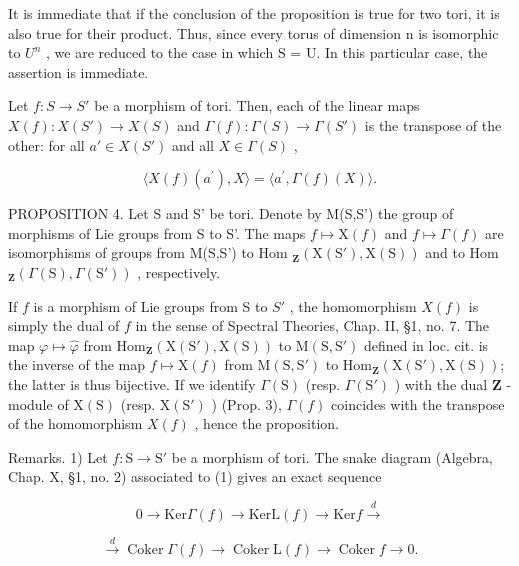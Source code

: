 It is immediate that if the conclusion of the proposition is true for two tori, it is also true for their product. Thus, since every torus of dimension n is isomorphic to \(U^{n}\) , we are reduced to the case in which S = U. In this particular case, the assertion is immediate.

Let \(f: S \to S'\) be a morphism of tori. Then, each of the linear maps \(X(f): X(S') \to X(S)\) and \(\Gamma(f): \Gamma(S) \to \Gamma(S')\) is the transpose of the other: for all \(a' \in X(S')\) and all \(X \in \Gamma(S)\) ,

\[
\langle X (f) (a ^ {\prime}), X \rangle = \langle a ^ {\prime}, \Gamma (f) (X) \rangle .\tag{3}
\]

PROPOSITION 4. Let S and S' be tori. Denote by M(S,S') the group of morphisms of Lie groups from S to S'. The maps \(f \mapsto \mathrm{X}(f)\) and \(f \mapsto \Gamma(f)\) are isomorphisms of groups from M(S,S') to Hom \(_{\mathbf{Z}}(\mathrm{X}(\mathrm{S}'),\mathrm{X}(\mathrm{S}))\) and to Hom \(_{\mathbf{Z}}(\Gamma(\mathrm{S}),\Gamma(\mathrm{S}'))\) , respectively.

If \(f\) is a morphism of Lie groups from S to \(S'\) , the homomorphism \(X(f)\) is simply the dual of \(f\) in the sense of Spectral Theories, Chap. II, §1, no. 7. The map \(\varphi \mapsto \hat{\varphi}\) from \(\mathrm{Hom}_{\mathbf{Z}}(\mathrm{X}(\mathrm{S}'), \mathrm{X}(\mathrm{S}))\) to \(\mathrm{M}(\mathrm{S},\mathrm{S}')\) defined in loc. cit. is the inverse of the map \(f \mapsto \mathrm{X}(f)\) from \(\mathrm{M}(\mathrm{S},\mathrm{S}')\) to \(\mathrm{Hom}_{\mathbf{Z}}(\mathrm{X}(\mathrm{S}'), \mathrm{X}(\mathrm{S}))\); the latter is thus bijective. If we identify \(\Gamma(\mathrm{S})\) (resp. \(\Gamma(\mathrm{S}')\) ) with the dual \(\mathbf{Z}\) -module of \(\mathrm{X}(\mathrm{S})\) (resp. \(\mathrm{X}(\mathrm{S}')\) ) (Prop. 3), \(\Gamma(f)\) coincides with the transpose of the homomorphism \(X(f)\) , hence the proposition.

Remarks. 1) Let \(f: \mathrm{S} \to \mathrm{S}'\) be a morphism of tori. The snake diagram (Algebra, Chap. X, §1, no. 2) associated to (1) gives an exact sequence

\[
0 \longrightarrow \mathrm{Ker} \Gamma (f) \longrightarrow \mathrm{KerL} (f) \longrightarrow \mathrm{Ker} f \stackrel {d} {\longrightarrow}\tag{4}
\]

\[
\stackrel {{d}} {{\longrightarrow}} \operatorname{Coker} \Gamma (f) \longrightarrow \operatorname{Coker} \mathrm{L} (f) \longrightarrow \operatorname{Coker} f \longrightarrow 0.
\]

